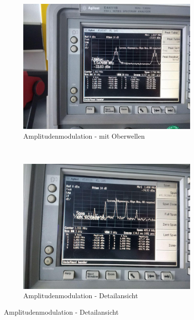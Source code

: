 \begin{figure}[t!]
	\centering
	\begin{subfigure}[t]{0.5\textwidth}
		\centering
		\includegraphics[width=\textwidth]{img/Aufgabenteil_c1.jpg}
		\caption{Amplitudenmodulation - mit Oberwellen}
	\end{subfigure}%
	~
	\begin{subfigure}[t]{0.5\textwidth}
		\centering
		\includegraphics[width=\textwidth]{img/Aufgabenteil_c2.jpg}
		\caption{Amplitudenmodulation - Detailansicht}
	\end{subfigure}
\end{figure}

